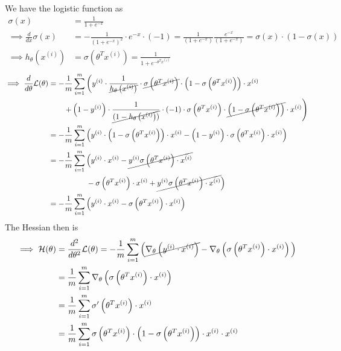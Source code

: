 We have the logistic function as
\begin{align*}
    \sigma\left(x\right)
     & =
    \frac{1}{1+e^{-x}}
    \\
    \implies
    \frac{d}{dx} \sigma\left(x\right)
     & =
    -\frac{1}{\left(1+e^{-x}\right)^2} \cdot e^{-x} \cdot (-1)
    =
    \frac{1}{\left(1+e^{-x}\right)}
    \frac{e^{-x}}{\left(1+e^{-x}\right)}
    =
    \sigma\left(x\right) \cdot \left(1-\sigma\left(x\right)\right)
    \\
    \implies
    h_{\theta}\left(x^{(i)}\right)
     & =
    \sigma\left(\theta^{T} x^{(i)}\right)
    =
    \frac{1}{1+e^{-\theta^{T} x^{(i)}}}
\end{align*}
\begin{align*}
    \implies
    \frac{d}{d\theta} \mathcal{L}(\theta)
     & =
    -\frac{1}{m} \sum_{i=1}^{m}
    \left(
    y^{(i)}
    \cdot \frac{1}{\cancel{h_{\theta}\left(x^{(i)}\right)}}
    \cdot \cancel{\sigma\left(\theta^{T} x^{(i)}\right)}
    \cdot \left(1-\sigma\left(\theta^{T} x^{(i)}\right)\right)
    \cdot x^{(i)}
    \right.
    \\ & \qquad
    \left.
    +
    \left(1-y^{(i)}\right)
    \cdot \frac{1}{\cancel{(1-h_{\theta}\left(x^{(i)}\right))}}
    \cdot (-1)
    \cdot \sigma\left(\theta^{T} x^{(i)}\right) \cdot \cancel{\left(1-\sigma\left(\theta^{T} x^{(i)}\right)\right)}
    \cdot x^{(i)}
    \right)
    \\ & =
    -\frac{1}{m} \sum_{i=1}^{m}
    \left(
    y^{(i)} \cdot \left(1-\sigma\left(\theta^{T} x^{(i)}\right)\right) \cdot x^{(i)}
    -
    \left(1-y^{(i)}\right) \cdot \sigma\left(\theta^{T} x^{(i)}\right) \cdot x^{(i)}
    \right)
    \\ & =
    -\frac{1}{m} \sum_{i=1}^{m}
    \Big(
    y^{(i)} \cdot x^{(i)}
    -
    \cancel{y^{(i)} \sigma\left(\theta^{T} x^{(i)}\right) \cdot x^{(i)}}
    \\ & \qquad \qquad \quad
    -
    \sigma\left(\theta^{T} x^{(i)}\right) \cdot x^{(i)}
    +
    \cancel{y^{(i)} \sigma\left(\theta^{T} x^{(i)}\right) \cdot x^{(i)}}
    \Big)
    \\ & =
    -\frac{1}{m} \sum_{i=1}^{m}
    \left(
    y^{(i)} \cdot x^{(i)}
    -
    \sigma\left(\theta^{T} x^{(i)}\right) \cdot x^{(i)}
    \right)
\end{align*}
The Hessian then is
\begin{align*}
    \implies
    \mathcal{H}(\theta)
     & =
    \frac{d^2}{d\theta^2} \mathcal{L}(\theta)
    =
    -\frac{1}{m} \sum_{i=1}^{m}
    \Big(
    \cancel{\nabla_{\theta} \left(y^{(i)} \cdot x^{(i)}\right)}
    -
    \nabla_{\theta} \left(\sigma\left(\theta^{T} x^{(i)}\right) \cdot x^{(i)}\right)
    \Big)
    \\ & =
    \frac{1}{m} \sum_{i=1}^{m}
    \nabla_{\theta} \left(\sigma\left(\theta^{T} x^{(i)}\right) \cdot x^{(i)}\right)
    \\ & =
    \frac{1}{m} \sum_{i=1}^{m}
    \sigma'\left(\theta^{T} x^{(i)}\right) \cdot x^{(i)}
    \\ & =
    \frac{1}{m} \sum_{i=1}^{m}
    \sigma\left(\theta^{T} x^{(i)}\right) \cdot \left(1-\sigma\left(\theta^{T} x^{(i)}\right)\right)
    \cdot x^{(i)}
    \cdot x^{(i)}
\end{align*}
